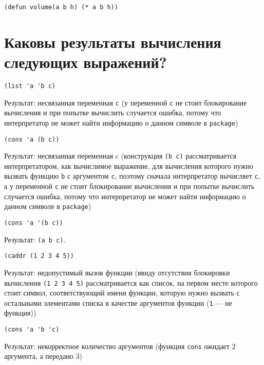 \begin{lstlisting}
(defun volume(a b h) (* a b h))
\end{lstlisting}
\clearpage

\section{Каковы результаты вычисления следующих выражений?}

\begin{lstlisting}
(list 'a 'b c)
\end{lstlisting}
Результат: несвязанная переменная \texttt{c} (у переменной \texttt{c} не стоит блокирование вычисления и при попытке вычислить случается ошибка, потому что интерпретатор не может найти информацию о данном символе в \texttt{package})
\vspace{20mm}

\begin{lstlisting}
(cons 'a (b c))
\end{lstlisting}
Результат: несвязанная переменная c (конструкция \texttt{(b c)} рассматривается интерпретатором, как вычислимое выражение, для вычисления которого нужно вызвать функцию \texttt{b} с аргументом \texttt{c}, поэтому сначала интерпретатор вычисляет \texttt{c}, а у переменной \texttt{c} не стоит блокирование вычисления и при попытке вычислить случается ошибка, потому что интерпретатор не может найти информацию о данном символе в \texttt{package})
\vspace{20mm}

\begin{lstlisting}
(cons 'a '(b c))
\end{lstlisting}
Результат: \texttt{(a b c)}.
\vspace{20mm}

\begin{lstlisting}
(caddr (1 2 3 4 5))
\end{lstlisting}
Результат: недопустимый вызов функции (ввиду отсутствия блокировки вычисления \texttt{(1 2 3 4 5)} рассматривается как список, на первом месте которого стоит символ, соответствующий имени функции, которую нужно вызвать с остальными элементами списка в качестве аргументов функции (\texttt{1} --- не функция))
\vspace{20mm}

\begin{lstlisting}
(cons 'a 'b 'c)
\end{lstlisting}
Результат: некорректное количество аргументов (функция \texttt{cons} ожидает 2 аргумента, а передано 3)
\vspace{20mm}

